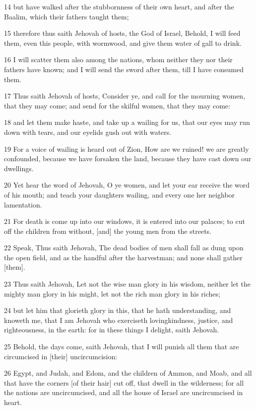\par 14 but have walked after the stubbornness of their own heart, and after the Baalim, which their fathers taught them;
\par 15 therefore thus saith Jehovah of hosts, the God of Israel, Behold, I will feed them, even this people, with wormwood, and give them water of gall to drink.
\par 16 I will scatter them also among the nations, whom neither they nor their fathers have known; and I will send the sword after them, till I have consumed them.
\par 17 Thus saith Jehovah of hosts, Consider ye, and call for the mourning women, that they may come; and send for the skilful women, that they may come:
\par 18 and let them make haste, and take up a wailing for us, that our eyes may run down with tears, and our eyelids gush out with waters.
\par 19 For a voice of wailing is heard out of Zion, How are we ruined! we are greatly confounded, because we have forsaken the land, because they have cast down our dwellings.
\par 20 Yet hear the word of Jehovah, O ye women, and let your ear receive the word of his mouth; and teach your daughters wailing, and every one her neighbor lamentation.
\par 21 For death is come up into our windows, it is entered into our palaces; to cut off the children from without, [and] the young men from the streets.
\par 22 Speak, Thus saith Jehovah, The dead bodies of men shall fall as dung upon the open field, and as the handful after the harvestman; and none shall gather [them].
\par 23 Thus saith Jehovah, Let not the wise man glory in his wisdom, neither let the mighty man glory in his might, let not the rich man glory in his riches;
\par 24 but let him that glorieth glory in this, that he hath understanding, and knoweth me, that I am Jehovah who exerciseth lovingkindness, justice, and righteousness, in the earth: for in these things I delight, saith Jehovah.
\par 25 Behold, the days come, saith Jehovah, that I will punish all them that are circumcised in [their] uncircumcision:
\par 26 Egypt, and Judah, and Edom, and the children of Ammon, and Moab, and all that have the corners [of their hair] cut off, that dwell in the wilderness; for all the nations are uncircumcised, and all the house of Israel are uncircumcised in heart.

